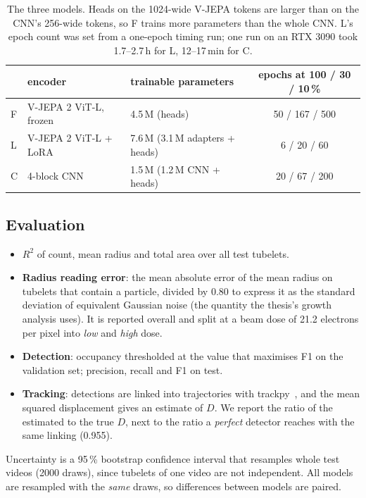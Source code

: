 \documentclass[11pt,a4paper]{article}
\newcommand{\F}{\textsf{F}}
\newcommand{\C}{\textsf{C}}
\newcommand{\Lo}{\textsf{L}}
\begin{document}
\begin{table}[t]
\centering\small
\begin{tabular}{lllc}
\toprule
& encoder & trainable parameters & epochs at 100 / 30 / 10\,\% \\
\midrule
\F{} & V-JEPA 2 ViT-L, frozen & 4.5\,M (heads) & 50 / 167 / 500 \\
\Lo{} & V-JEPA 2 ViT-L + LoRA & 7.6\,M (3.1\,M adapters + heads) & 6 / 20 / 60 \\
\C{} & 4-block CNN & 1.5\,M (1.2\,M CNN + heads) & 20 / 67 / 200 \\
\bottomrule
\end{tabular}
\caption{The three models. Heads on the 1024-wide V-JEPA tokens are larger than on the
CNN's 256-wide tokens, so \F{} trains more parameters than the whole CNN. \Lo{}'s epoch
count was set from a one-epoch timing run; one run on an RTX 3090 took 1.7--2.7\,h for
\Lo{}, 12--17\,min for \C{}.}
\label{tab:budget}
\end{table}

\subsection{Evaluation}

\begin{itemize}
  \item \textbf{$R^2$} of count, mean radius and total area over all test tubelets.
  \item \textbf{Radius reading error}: the mean absolute error of the mean radius on
        tubelets that contain a particle, divided by 0.80 to express it as the standard
        deviation of equivalent Gaussian noise (the quantity the thesis's growth analysis
        uses). It is reported overall and split at a beam dose of 21.2 electrons per pixel
        into \emph{low} and \emph{high} dose.
  \item \textbf{Detection}: occupancy thresholded at the value that maximises F1 on the
        validation set; precision, recall and F1 on test.
  \item \textbf{Tracking}: detections are linked into trajectories with
        trackpy~\cite{trackpy}, and the mean squared displacement gives an estimate of
        $D$. We report the ratio of the estimated to the true $D$, next to the ratio a
        \emph{perfect} detector reaches with the same linking (0.955).
\end{itemize}
Uncertainty is a 95\,\% bootstrap confidence interval that resamples whole test videos
(2000 draws), since tubelets of one video are not independent. All models are resampled
with the \emph{same} draws, so differences between models are paired.
\end{document}
